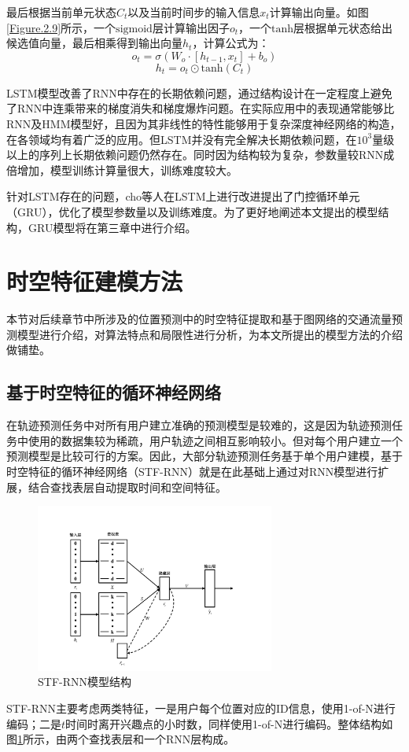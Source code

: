 \documentclass[master]{thesis-uestc}
\begin{document}
最后根据当前单元状态$C_t$以及当前时间步的输入信息$x_t$计算输出向量。如图\ref{Figure.2.9}所示，一个$\mathrm{sigmoid}$层计算输出因子$o_t$，一个$\mathrm{tanh}$层根据单元状态给出候选值向量，最后相乘得到输出向量$h_t$，计算公式为：
\begin{equation}
   o_{t} = \sigma(W_o\cdot[h_{t-1},x_{t}]+b_o)
\end{equation}
\begin{equation}
   h_t = o_t \odot \mathrm{tanh}(C_t)
\end{equation}

LSTM模型改善了RNN中存在的长期依赖问题，通过结构设计在一定程度上避免了RNN中连乘带来的梯度消失和梯度爆炸问题。在实际应用中的表现通常能够比RNN及HMM模型好，且因为其非线性的特性能够用于复杂深度神经网络的构造，在各领域均有着广泛的应用。但LSTM并没有完全解决长期依赖问题，在$10^3$量级以上的序列上长期依赖问题仍然存在。同时因为结构较为复杂，参数量较RNN成倍增加，模型训练计算量很大，训练难度较大。

针对LSTM存在的问题，cho等人在LSTM上进行改进提出了门控循环单元（GRU），优化了模型参数量以及训练难度。为了更好地阐述本文提出的模型结构，GRU模型将在第三章中进行介绍。

\section{时空特征建模方法}
本节对后续章节中所涉及的位置预测中的时空特征提取和基于图网络的交通流量预测模型进行介绍，对算法特点和局限性进行分析，为本文所提出的模型方法的介绍做铺垫。

\subsection{基于时空特征的循环神经网络}
在轨迹预测任务中对所有用户建立准确的预测模型是较难的，这是因为轨迹预测任务中使用的数据集较为稀疏，用户轨迹之间相互影响较小。但对每个用户建立一个预测模型是比较可行的方案。因此，大部分轨迹预测任务基于单个用户建模，基于时空特征的循环神经网络（STF-RNN）就是在此基础上通过对RNN模型进行扩展，结合查找表层自动提取时间和空间特征。

\begin{figure}[!ht]
\centering 
\includegraphics[width=0.7\textwidth]{./pic/stf-rnn.pdf}
\caption{STF-RNN模型结构}
\label{Figure.2.10}
\end{figure}
STF-RNN主要考虑两类特征，一是用户每个位置对应的ID信息，使用1-of-N进行编码；二是$t$时间时离开兴趣点的小时数，同样使用1-of-N进行编码。整体结构如图\ref{Figure.2.10}所示，由两个查找表层和一个RNN层构成。
\end{document}

